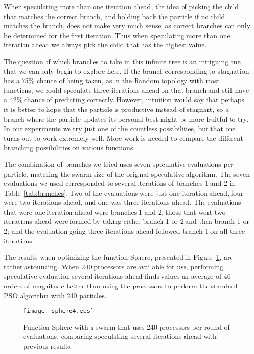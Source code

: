 \documentclass[journal,letterpaper]{IEEEtran}
\newcommand{\fig}[1]{Figure~\ref{fig:#1}}
\begin{document}
When speculating more than one iteration ahead, the idea of picking the child
that matches the correct branch, and holding back the particle if no child
matches the branch, does not make very much sense, as correct branches can only
be determined for the first iteration.  Thus when speculating more than one
iteration ahead we always pick the child that has the highest value.

The question of which branches to take in this infinite tree is an intriguing
one that we can only begin to explore here.  If the branch corresponding to
stagnation has a 75\% chance of being taken, as in the Random topology with
most functions, we could speculate three iterations ahead on that branch and
still have a 42\% chance of predicting correctly.  However, intuition would say
that perhaps it is better to hope that the particle is productive instead of
stagnant, so a branch where the particle updates its personal best might be
more fruitful to try.  In our experiments we try just one of the countless
possibilities, but that one turns out to work extremely well.  More work is
needed to compare the different branching possibilities on various functions.

The combination of branches we tried uses seven speculative evaluations per
particle, matching the swarm size of the original speculative algorithm.  The
seven evaluations we used corresponded to several iterations of branches 1 and
2 in Table~\ref{tab:branches}.  Two of the evaluations were just one iteration
ahead, four were two iterations ahead, and one was three iterations ahead.  The
evaluations that were one iteration ahead were branches 1 and 2; those that
went two iterations ahead were formed by taking either branch 1 or 2 and then
branch 1 or 2; and the evaluation going three iterations ahead followed branch
1 on all three iterations.

The results when optimizing the function Sphere, presented in
\fig{sphere-manyiters}, are rather astounding.  When 240 processors are
available for use, performing speculative evaluation several iterations ahead
finds values an average of 46 orders of magnitude better than using the
processors to perform the standard PSO algorithm with 240 particles.

\begin{figure}
  \centering
  \texttt{[image: sphere4.eps]}
  \caption{Function Sphere with a swarm that uses 240 processors per round of
  evaluations, comparing speculating several iterations ahead with previous
  results.}
  \label{fig:sphere-manyiters}
\end{figure}
\end{document}
